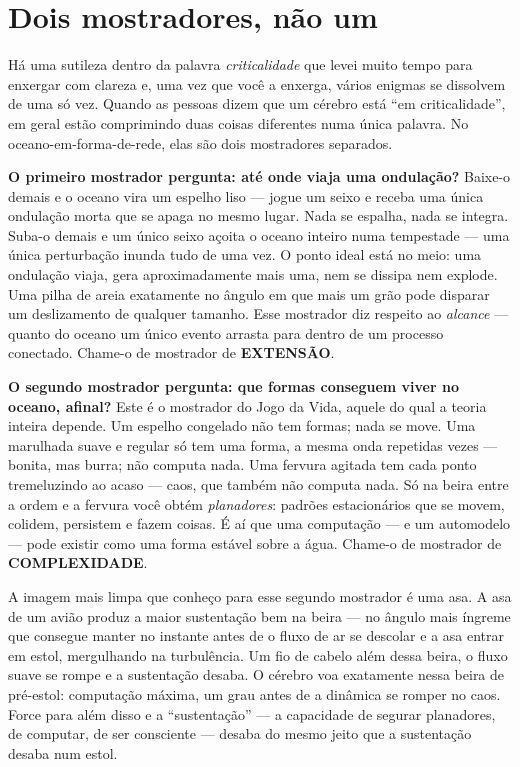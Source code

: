 \documentclass[11pt, twoside, openright]{book}
\begin{document}
\section*{Dois mostradores, não um}

Há uma sutileza dentro da palavra \textit{criticalidade} que levei muito tempo para enxergar com clareza e, uma vez que você a enxerga, vários enigmas se dissolvem de uma só vez. Quando as pessoas dizem que um cérebro está ``em criticalidade'', em geral estão comprimindo duas coisas diferentes numa única palavra. No oceano-em-forma-de-rede, elas são dois mostradores separados.

\textbf{O primeiro mostrador pergunta: até onde viaja uma ondulação?} Baixe-o demais e o oceano vira um espelho liso --- jogue um seixo e receba uma única ondulação morta que se apaga no mesmo lugar. Nada se espalha, nada se integra. Suba-o demais e um único seixo açoita o oceano inteiro numa tempestade --- uma única perturbação inunda tudo de uma vez. O ponto ideal está no meio: uma ondulação viaja, gera aproximadamente mais uma, nem se dissipa nem explode. Uma pilha de areia exatamente no ângulo em que mais um grão pode disparar um deslizamento de qualquer tamanho. Esse mostrador diz respeito ao \textit{alcance} --- quanto do oceano um único evento arrasta para dentro de um processo conectado. Chame-o de mostrador de \textbf{EXTENSÃO}.

\textbf{O segundo mostrador pergunta: que formas conseguem viver no oceano, afinal?} Este é o mostrador do Jogo da Vida, aquele do qual a teoria inteira depende. Um espelho congelado não tem formas; nada se move. Uma marulhada suave e regular só tem uma forma, a mesma onda repetidas vezes --- bonita, mas burra; não computa nada. Uma fervura agitada tem cada ponto tremeluzindo ao acaso --- caos, que também não computa nada. Só na beira entre a ordem e a fervura você obtém \textit{planadores}: padrões estacionários que se movem, colidem, persistem e fazem coisas. É aí que uma computação --- e um automodelo --- pode existir como uma forma estável sobre a água. Chame-o de mostrador de \textbf{COMPLEXIDADE}.

A imagem mais limpa que conheço para esse segundo mostrador é uma asa. A asa de um avião produz a maior sustentação bem na beira --- no ângulo mais íngreme que consegue manter no instante antes de o fluxo de ar se descolar e a asa entrar em estol, mergulhando na turbulência. Um fio de cabelo além dessa beira, o fluxo suave se rompe e a sustentação desaba. O cérebro voa exatamente nessa beira de pré-estol: computação máxima, um grau antes de a dinâmica se romper no caos. Force para além disso e a ``sustentação'' --- a capacidade de segurar planadores, de computar, de ser consciente --- desaba do mesmo jeito que a sustentação desaba num estol.
\end{document}
